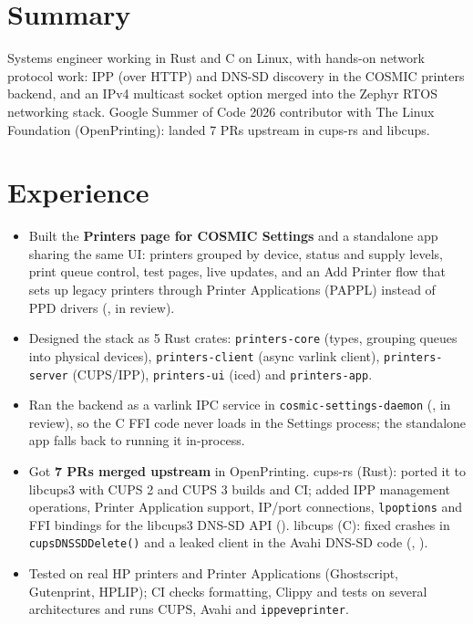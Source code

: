\documentclass[10pt]{article}
\begin{document}

\section*{Summary}
Systems engineer working in Rust and C on Linux, with hands-on network protocol work: IPP (over HTTP) and DNS-SD discovery in the COSMIC printers backend, and an IPv4 multicast socket option merged into the Zephyr RTOS networking stack. Google Summer of Code 2026 contributor with The Linux Foundation (OpenPrinting): landed 7 PRs upstream in cups-rs and libcups.

\section*{Experience}
\begin{itemize}
  \item Built the \textbf{Printers page for COSMIC Settings} and a standalone app sharing the same UI: printers grouped by device, status and supply levels, print queue control, test pages, live updates, and an Add Printer flow that sets up legacy printers through Printer Applications (PAPPL) instead of PPD drivers (, in review).
  \item Designed the stack as 5 Rust crates: \texttt{printers-core} (types, grouping queues into physical devices), \texttt{printers-client} (async varlink client), \texttt{printers-server} (CUPS/IPP), \texttt{printers-ui} (iced) and \texttt{printers-app}.
  \item Ran the backend as a varlink IPC service in \texttt{cosmic-settings-daemon} (, in review), so the C FFI code never loads in the Settings process; the standalone app falls back to running it in-process.
  \item Got \textbf{7 PRs merged upstream} in OpenPrinting. cups-rs (Rust): ported it to libcups3 with CUPS 2 and CUPS 3 builds and CI; added IPP management operations, Printer Application support, IP/port connections, \texttt{lpoptions} and FFI bindings for the libcups3 DNS-SD API (). libcups (C): fixed crashes in \texttt{cupsDNSSDDelete()} and a leaked client in the Avahi DNS-SD code (, ).
  \item Tested on real HP printers and Printer Applications (Ghostscript, Gutenprint, HPLIP); CI checks formatting, Clippy and tests on several architectures and runs CUPS, Avahi and \texttt{ippeveprinter}.
\end{itemize}
\end{document}
